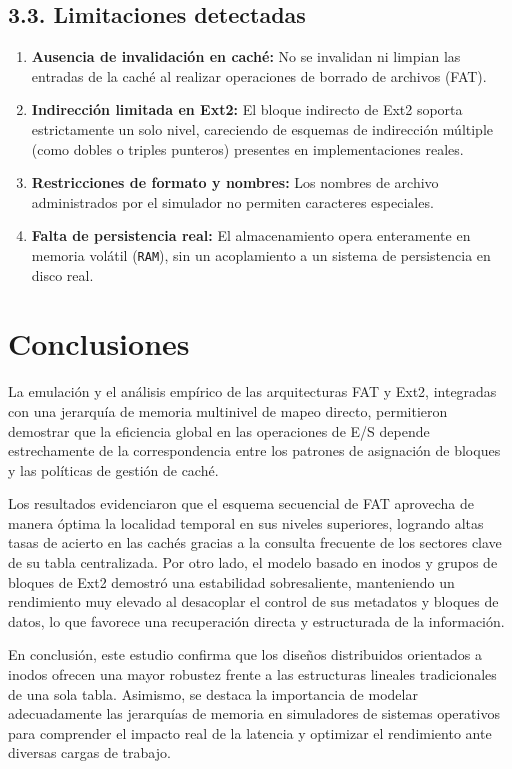 \documentclass[12pt,a4paper]{article}
\begin{document}
	\subsection{3.3. Limitaciones detectadas}
	\begin{enumerate}
		\item \textbf{Ausencia de invalidación en caché:} No se invalidan ni limpian las entradas de la caché al realizar operaciones de borrado de archivos (FAT).
		\item \textbf{Indirección limitada en Ext2:} El bloque indirecto de Ext2 soporta estrictamente un solo nivel, careciendo de esquemas de indirección múltiple (como dobles o triples punteros) presentes en implementaciones reales.
		\item \textbf{Restricciones de formato y nombres:} Los nombres de archivo administrados por el simulador no permiten caracteres especiales.
		\item \textbf{Falta de persistencia real:} El almacenamiento opera enteramente en memoria volátil (\texttt{RAM}), sin un acoplamiento a un sistema de persistencia en disco real.
	\end{enumerate}
	
	\section{Conclusiones}
	La emulación y el análisis empírico de las arquitecturas FAT y Ext2, integradas con una jerarquía de memoria multinivel de mapeo directo, permitieron demostrar que la eficiencia global en las operaciones de E/S depende estrechamente de la correspondencia entre los patrones de asignación de bloques y las políticas de gestión de caché. 
	
	Los resultados evidenciaron que el esquema secuencial de FAT aprovecha de manera óptima la localidad temporal en sus niveles superiores, logrando altas tasas de acierto en las cachés gracias a la consulta frecuente de los sectores clave de su tabla centralizada. Por otro lado, el modelo basado en inodos y grupos de bloques de Ext2 demostró una estabilidad sobresaliente, manteniendo un rendimiento muy elevado al desacoplar el control de sus metadatos y bloques de datos, lo que favorece una recuperación directa y estructurada de la información.
	
	En conclusión, este estudio confirma que los diseños distribuidos orientados a inodos ofrecen una mayor robustez frente a las estructuras lineales tradicionales de una sola tabla. Asimismo, se destaca la importancia de modelar adecuadamente las jerarquías de memoria en simuladores de sistemas operativos para comprender el impacto real de la latencia y optimizar el rendimiento ante diversas cargas de trabajo.
	
\end{document}
